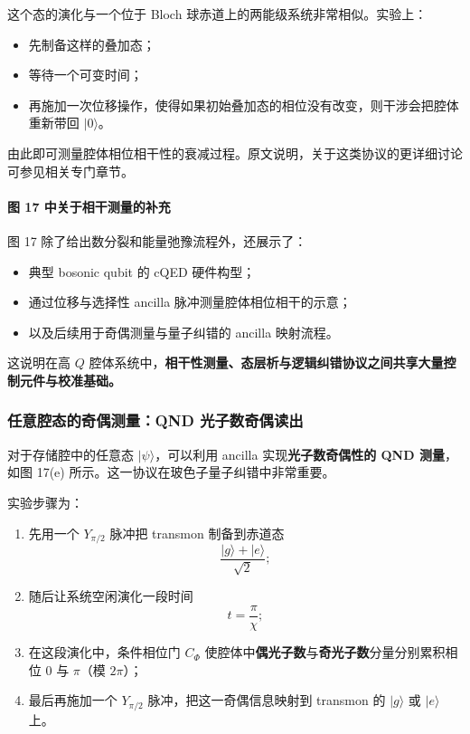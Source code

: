 \documentclass[12pt,a4paper,oneside]{ctexbook}
\begin{document}
这个态的演化与一个位于 Bloch 球赤道上的两能级系统非常相似。实验上：
\begin{itemize}
    \item 先制备这样的叠加态；
    \item 等待一个可变时间；
    \item 再施加一次位移操作，使得如果初始叠加态的相位没有改变，则干涉会把腔体重新带回 \(|0\rangle\)。
\end{itemize}

由此即可测量腔体相位相干性的衰减过程。原文说明，关于这类协议的更详细讨论可参见相关专门章节。

\paragraph{图 17 中关于相干测量的补充}
图 17 除了给出数分裂和能量弛豫流程外，还展示了：
\begin{itemize}
    \item 典型 bosonic qubit 的 cQED 硬件构型；
    \item 通过位移与选择性 ancilla 脉冲测量腔体相位相干的示意；
    \item 以及后续用于奇偶测量与量子纠错的 ancilla 映射流程。
\end{itemize}

这说明在高 \(Q\) 腔体系统中，\textbf{相干性测量、态层析与逻辑纠错协议之间共享大量控制元件与校准基础。}

\subsubsection{任意腔态的奇偶测量：QND 光子数奇偶读出}

对于存储腔中的任意态 \(|\psi\rangle\)，可以利用 ancilla 实现\textbf{光子数奇偶性的 QND 测量}，如图 17(e) 所示。这一协议在玻色子量子纠错中非常重要。

实验步骤为：
\begin{enumerate}
    \item 先用一个 \(Y_{\pi/2}\) 脉冲把 transmon 制备到赤道态
    \[
    \frac{|g\rangle+|e\rangle}{\sqrt2};
    \]
    \item 随后让系统空闲演化一段时间
    \[
    t=\frac{\pi}{\chi};
    \]
    \item 在这段演化中，条件相位门 \(C_\Phi\) 使腔体中\textbf{偶光子数}与\textbf{奇光子数}分量分别累积相位 \(0\) 与 \(\pi\)（模 \(2\pi\)）；
    \item 最后再施加一个 \(Y_{\pi/2}\) 脉冲，把这一奇偶信息映射到 transmon 的 \(|g\rangle\) 或 \(|e\rangle\) 上。
\end{enumerate}
\end{document}
